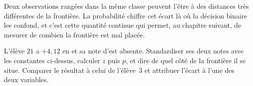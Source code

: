 \begin{resultat}
Deux observations rangées dans la même classe peuvent l'être à des distances très
différentes de la frontière. La probabilité chiffre cet écart là où la décision
binaire les confond, et c'est cette quantité continue qui permet, au chapitre
suivant, de mesurer de combien la frontière est mal placée.
\end{resultat}

\begin{exercice}
L'élève $21$ a $+4{,}12$ en \Herb et sa note d'\Runes est absente. Standardiser
ses deux notes avec les constantes ci-dessus, calculer $z$ puis $p$, et dire de
quel côté de la frontière il se situe. Comparer le résultat à celui de
l'élève~$3$ et attribuer l'écart à l'une des deux variables.
\end{exercice}
